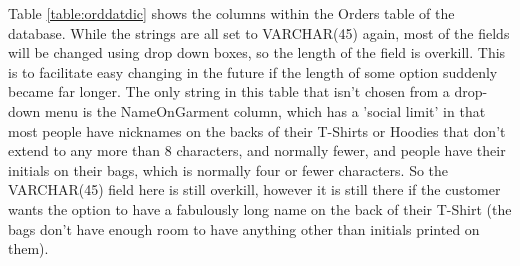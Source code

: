 \documentclass[
11pt, %
a4paper, %
oneside, %
headinclude,footinclude, %
BCOR5mm, %
]{scrartcl}
\begin{document}
\begin{table}[ht]
	\small
	\centering
	\caption{Order Data Dictionary}
	\label{table:orddatdic}
\end{table}
\par Table \ref{table:orddatdic} shows the columns within the Orders table of the database. While the strings are all set to VARCHAR(45) again, most of the fields will be changed using drop down boxes, so the length of the field is overkill. This is to facilitate easy changing in the future if the length of some option suddenly became far longer. The only string in this table that isn't chosen from a drop-down menu is the NameOnGarment column, which has a 'social limit' in that most people have nicknames on the backs of their T-Shirts or Hoodies that don't extend to any more than 8 characters, and normally fewer, and people have their initials on their bags, which is normally four or fewer characters. So the VARCHAR(45) field here is still overkill, however it is still there if the customer wants the option to have a fabulously long name on the back of their T-Shirt (the bags don't have enough room to have anything other than initials printed on them).
\begin{table}[ht]
	\small
	\centering
	\caption{Items Data Dictionary}
\label{table:itedatdic}
\end{table}
\end{document}
